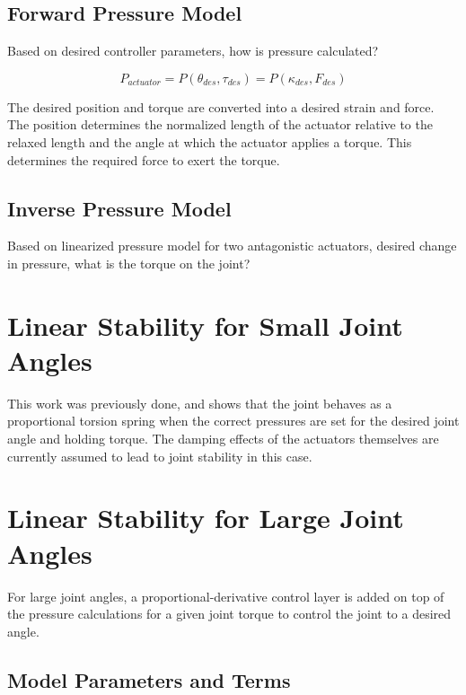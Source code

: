 \documentclass[12pt, letterpaper, oneside, notitlepage, onecolumn]{article}
\newcommand{\bbs}[1]{\section{#1}}
\newcommand{\bbss}[1]{\subsection{#1}}
\begin{document}
\bbss{Forward Pressure Model}

Based on desired controller parameters, how is pressure calculated?

\begin{equation}
P_{actuator} = P(\theta_{des}, \tau_{des}) = P(\kappa_{des}, F_{des})
\end{equation}

The desired position and torque are converted into a desired strain and force.
The position determines the normalized length of the actuator relative to the 
relaxed length and the angle at which the actuator applies a torque. This
determines the required force to exert the torque.

\bbss{Inverse Pressure Model}

Based on linearized pressure model for two antagonistic actuators, desired 
change in pressure, what is the torque on the joint?

\bbs{Linear Stability for Small Joint Angles}

This work was previously done, and shows that the joint behaves as a
proportional torsion spring when the correct pressures are set for the desired
joint angle and holding torque. The damping effects of the actuators themselves
are currently assumed to lead to joint stability in this case.

\bbs{Linear Stability for Large Joint Angles}

For large joint angles, a proportional-derivative control layer is added on top
of the pressure calculations for a given joint torque to control the joint to a
desired angle.

\bbss{Model Parameters and Terms}
\end{document}
